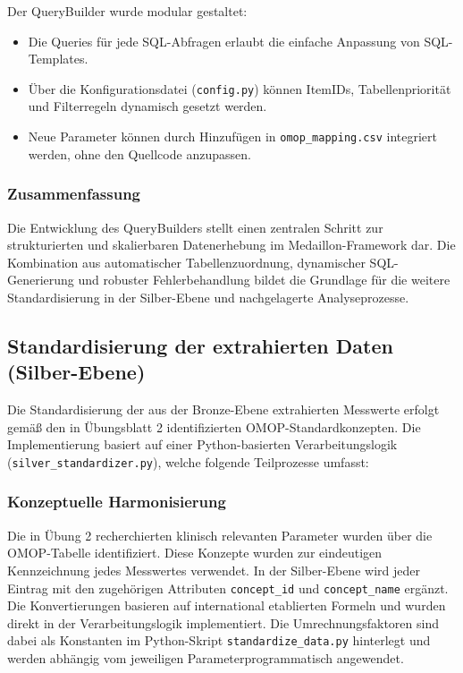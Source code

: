 \documentclass[12pt]{article}
\begin{document}
Der QueryBuilder wurde modular gestaltet:
\begin{itemize}
    \item Die Queries für jede SQL-Abfragen erlaubt die einfache Anpassung von SQL-Templates.
    \item Über die Konfigurationsdatei (\texttt{config.py}) können ItemIDs, Tabellenpriorität und Filterregeln dynamisch gesetzt werden.
    \item Neue Parameter können durch Hinzufügen in \texttt{omop\_mapping.csv} integriert werden, ohne den Quellcode anzupassen.
\end{itemize}

\subsubsection{Zusammenfassung}

Die Entwicklung des QueryBuilders stellt einen zentralen Schritt zur strukturierten und skalierbaren Datenerhebung im Medaillon-Framework dar. Die Kombination aus automatischer Tabellenzuordnung, dynamischer SQL-Generierung und robuster Fehlerbehandlung bildet die Grundlage für die weitere Standardisierung in der Silber-Ebene und nachgelagerte Analyseprozesse.


\subsection{Standardisierung der extrahierten Daten (Silber-Ebene)}

Die Standardisierung der aus der Bronze-Ebene extrahierten Messwerte erfolgt gemäß den in Übungsblatt 2 identifizierten OMOP-Standardkonzepten. Die Implementierung basiert auf einer Python-basierten Verarbeitungslogik (\texttt{silver\_standardizer.py}), welche folgende Teilprozesse umfasst:

\subsubsection{Konzeptuelle Harmonisierung}

Die in Übung 2 recherchierten klinisch relevanten Parameter wurden über die OMOP-Tabelle identifiziert. Diese Konzepte wurden zur eindeutigen Kennzeichnung jedes Messwertes verwendet. In der Silber-Ebene wird jeder Eintrag mit den zugehörigen Attributen \texttt{concept\_id} und \texttt{concept\_name} ergänzt. Die Konvertierungen basieren auf international etablierten Formeln und wurden direkt in der Verarbeitungslogik implementiert. Die Umrechnungsfaktoren sind dabei als Konstanten im Python-Skript \texttt{standardize\_data.py} hinterlegt und werden abhängig vom jeweiligen Parameterprogrammatisch angewendet.
\end{document}
